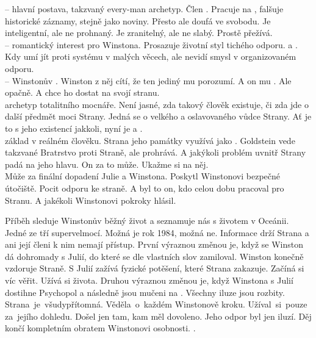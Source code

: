 \documentclass{extarticle} %
\begin{document}
\noindent
{} -- hlavní postava, takzvaný every-man archetyp.
Člen .
Pracuje na , falšuje historické záznamy, stejně jako noviny.
Přesto ale doufá ve svobodu.
Je inteligentní, ale ne prohnaný.
Je zranitelný, ale ne slabý.
Prostě přežívá.\\
 -- romantický interest pro Winstona.
Prosazuje životní styl tichého odporu.
 a .
Kdy umí jít proti systému v malých věcech, ale nevidí smysl v organizovaném odporu.
\\
 -- Winstonův .
Winston z něj cítí, že ten jediný mu porozumí.
A on mu .
Ale opačně.
A chce ho dostat na svojí stranu.\\
 archetyp totalitního mocnáře.
Není jasné, zda takový člověk existuje, či zda jde o další předmět moci Strany.
Jedná se o velkého a oslavovaného vůdce Strany.
Ať je to s jeho existencí jakkoli, nyní je  a .\\
 základ v reálném člověku.
Strana jeho památky využívá jako .
Goldstein vede takzvané Bratrstvo proti Straně, ale prohrává.
A jakýkoli problém uvnitř Strany padá na jeho hlavu.
On za to může.
Ukažme si na něj.\\
 Může za finální dopadení Julie a Winstona.
Poskytl Winstonovi bezpečné útočiště.
Pocit odporu ke straně.
A byl to on, kdo celou dobu pracoval pro Stranu.
A jakékoli Winstonovi pokroky hlásil.

Příběh sleduje Winstonův běžný život a seznamuje nás s životem v Oceánii.
Jedné ze tří supervelmocí.
Možná je rok 1984, možná ne.
Informace drží Strana a ani její členi k nim nemají přístup.
První výraznou změnou je, když se Winston dá dohromady s Julií, do které se dle vlastních slov zamiloval.
Winston konečně vzdoruje Straně.
S Julií zažívá fyzické potěšení, které Strana zakazuje.
Začíná si víc věřit.
Užívá si života.
Druhou výraznou změnou je, když Winstona s Julií dostihne Psychopol a následně jsou mučeni na .
Všechny iluze jsou rozbity.
Strana~je~všudypřítomná.
Věděla~o~každém Winstonově kroku.
Užíval~si~pouze za~jejího dohledu.
Došel jen tam, kam měl dovoleno.
Jeho odpor byl jen iluzí.
Děj končí kompletním obratem Winstonovi osobnosti.
.
\end{document}

